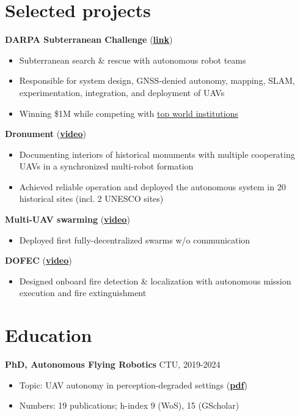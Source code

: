 \documentclass[12pt,a4paper]{article}
\newcommand\Colorhreff[3][reff]{\href{#2}{\color{#1}#3}}
\newcommand{\bluesquare}{\raisebox{0.5ex}{\textcolor{primary}{\rule{0.5ex}{0.5ex}}}}
\begin{document}
\begin{paracol}{2}
\section*{Selected projects}

\noindent
\textbf{DARPA Subterranean Challenge} (\Colorhreff{http://mrs.fel.cvut.cz/projects/darpa}{\textbf{link}})
\begin{itemize}[label=\bluesquare, left=0.5em]
  \item Subterranean search \& rescue with autonomous robot teams
  \item Responsible for system design, GNSS-denied autonomy, mapping, SLAM, experimentation, integration, and deployment of UAVs
  \item Winning \$1M while competing with \Colorhreff{https://spectrum.ieee.org/darpa-subterranean-challenge}{top world institutions} 
\end{itemize}

\vspace{0.2cm}
\noindent
\textbf{Dronument} (\Colorhreff{https://www.youtube.com/watch?v=Gx-mBklSbYc}{\textbf{video}})
\begin{itemize}[label=\bluesquare, left=0.5em]
    \item Documenting interiors of historical monuments with multiple cooperating UAVs in a synchronized multi-robot formation
    \item Achieved reliable operation and deployed the autonomous system in 20 historical sites (incl. 2 UNESCO sites)
\end{itemize}

\vspace{0.2cm}
\noindent
\textbf{Multi-UAV swarming} (\Colorhreff{https://www.youtube.com/watch?v=Ax3ONfo1hMA}{\textbf{video}})
\begin{itemize}[label=\bluesquare, left=0.5em]
    \item Deployed first fully-decentralized swarms w/o communication
\end{itemize}

\vspace{0.2cm}
\noindent
\textbf{DOFEC} (\Colorhreff{https://www.youtube.com/watch?v=QHpifXJzH5g}{\textbf{video}})
\begin{itemize}[label=\bluesquare, left=0.5em]
    \item Designed onboard fire detection \& localization with autonomous mission execution and fire extinguishment
\end{itemize}

\section*{Education}
\textbf{PhD, Autonomous Flying Robotics} \hfill CTU, 2019-2024
\begin{itemize}[label=\bluesquare, left=0.5em]
  \item Topic: UAV autonomy in perception-degraded settings (\Colorhreff{https://mrs.fel.cvut.cz/data/papers/petracek_phd_thesis.pdf}{\textbf{pdf}})
  \item Numbers: 19 publications; h-index 9 (WoS), 15 (GScholar)
\end{itemize}


\end{paracol}
\end{document}
